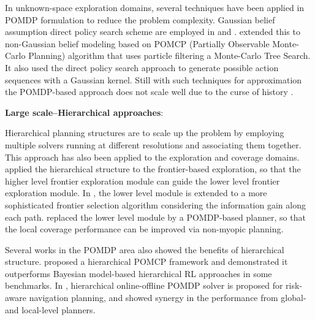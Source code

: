 \documentclass{article}
\newcommand{\ph}[1]{{\textbf{#1}:}} %
\begin{document}
In unknown-space exploration domains, several techniques have been applied in POMDP formulation to reduce the problem complexity.
Gaussian belief assumption direct policy search scheme are employed in \cite{martinez2009bayesian} and \cite{indelman2015planning}.
\citet{Lauri2016planning} extended this to non-Gaussian belief modeling based on POMCP (Partially Observable Monte-Carlo Planning) \cite{silver2010monte} algorithm that uses particle filtering a Monte-Carlo Tree Search.
It also used the direct policy search approach to generate possible action sequences with a Gaussian kernel.
Still with such techniques for approximation the POMDP-based approach does not scale well due to the curse of history \cite{Pineau03}.






\ph{Large scale--Hierarchical approaches}

Hierarchical planning structures are to scale up the problem by employing multiple solvers running at different resolutions and associating them together.
This approach has also been applied to the exploration and coverage domains.
%
\citet{umari2017autonomous} applied the hierarchical structure to the frontier-based exploration, so that the higher level frontier exploration module can guide the lower level frontier exploration module.
In \cite{dang2019explore}, the lower level module is extended to a more sophisticated frontier selection algorithm considering the information gain along each path.
\citet{Lauri2016planning} replaced the lower level module by a POMDP-based planner, so that the local coverage performance can be improved via non-myopic planning.

Several works in the POMDP area also showed the benefits of hierarchical structure.
\citet{vien2015hierarchical} proposed a hierarchical POMCP framework and demonstrated it outperforms Bayesian model-based hierarchical RL approaches in some benchmarks.
In \cite{kim2019bi}, hierarchical online-offline POMDP solver is proposed for risk-aware navigation planning, and showed synergy in the performance from global- and local-level planners.
\end{document}
